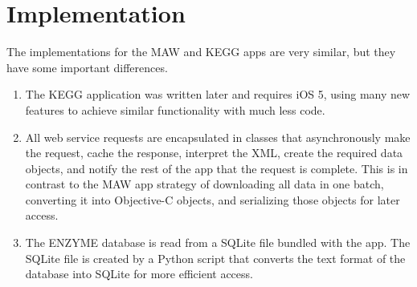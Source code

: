 \section{Implementation}
\label{sect:kegg_implementation}

The implementations for the MAW and KEGG apps are very similar, but they have
some important differences.

\begin{enumerate}

    \item The KEGG application was written later and requires iOS 5, using many
    new features to achieve similar functionality with much less code.

    \item All web service requests are encapsulated in classes that
    asynchronously make the request, cache the response, interpret the XML,
    create the required data objects, and notify the rest of the app that the
    request is complete. This is in contrast to the MAW app strategy of
    downloading all data in one batch, converting it into Objective-C objects,
    and serializing those objects for later access.

    \item The ENZYME database is read from a SQLite file bundled with the app.
    The SQLite file is created by a Python script that converts the text format
    of the database into SQLite for more efficient access.

\end{enumerate}

